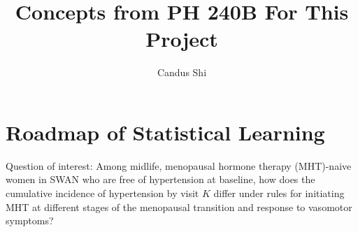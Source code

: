 \documentclass[12pt]{article}
\DeclareMathOperator{\1}{\mathds{1}}
\begin{document}
\title{Concepts from PH 240B For This Project}
\author{Candus Shi}
\maketitle

\section{Roadmap of Statistical Learning}
Question of interest: Among midlife, menopausal hormone therapy (MHT)-naive women in SWAN who are free of hypertension at baseline, how does the cumulative incidence of hypertension by visit $K$ differ under rules for initiating MHT at different stages of the menopausal transition and response to vasomotor symptoms?

\hfill
\end{document}
